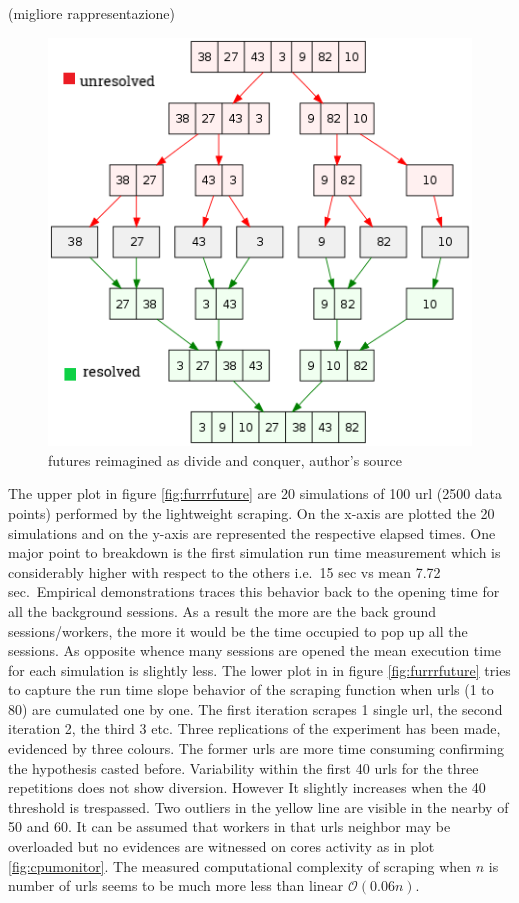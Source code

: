\documentclass[
  12pt,
  a4paper,
  oneside]{book}
\theoremstyle{definition}
\theoremstyle{definition}
\theoremstyle{definition}
\theoremstyle{remark}
\begin{document}
(migliore rappresentazione)

\begin{figure}
\centering
\includegraphics{images/divideconquer.png}
\caption{\label{fig:divideconquer}futures reimagined as divide and conquer, author's source}
\end{figure}

The upper plot in figure \ref{fig:furrrfuture} are 20 simulations of 100 url (2500 data points) performed by the lightweight scraping. On the x-axis are plotted the 20 simulations and on the y-axis are represented the respective elapsed times. One major point to breakdown is the first simulation run time measurement which is considerably higher with respect to the others i.e.~15 sec vs mean 7.72 sec.~Empirical demonstrations traces this behavior back to the opening time for all the background sessions. As a result the more are the back ground sessions/workers, the more it would be the time occupied to pop up all the sessions. As opposite whence many sessions are opened the mean execution time for each simulation is slightly less.
The lower plot in in figure \ref{fig:furrrfuture} tries to capture the run time slope behavior of the scraping function when urls (1 to 80) are cumulated one by one. The first iteration scrapes 1 single url, the second iteration 2, the third 3 etc. Three replications of the experiment has been made, evidenced by three colours. The former urls are more time consuming confirming the hypothesis casted before. Variability within the first 40 urls for the three repetitions does not show diversion. However It slightly increases when the 40 threshold is trespassed. Two outliers in the yellow line are visible in the nearby of 50 and 60. It can be assumed that workers in that urls neighbor may be overloaded but no evidences are witnessed on cores activity as in plot \ref{fig:cpumonitor}. The measured computational complexity of scraping when \(n\) is number of urls seems to be much more less than linear \(\mathcal{O}(0.06n)\).
\end{document}
